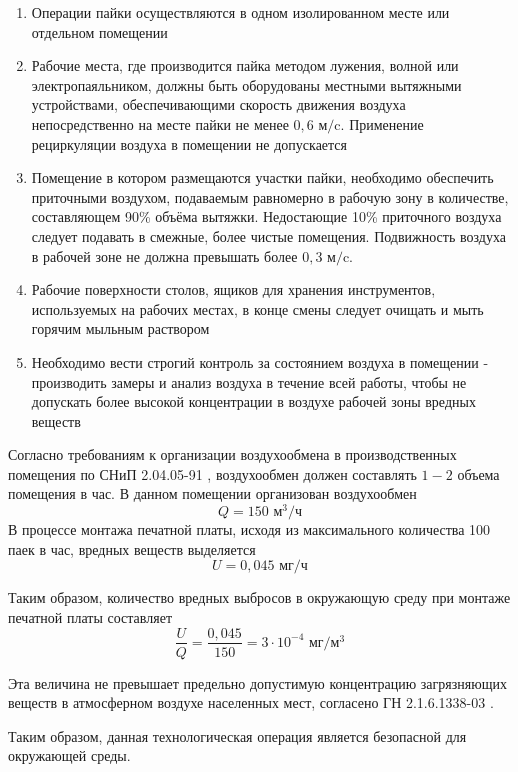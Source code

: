 \begin{enumerate}
    \item Операции пайки осуществляются в одном изолированном месте или отдельном помещении
    \item Рабочие места, где производится пайка методом лужения, волной или
        электропаяльником, должны быть оборудованы местными вытяжными устройствами,
        обеспечивающими скорость движения воздуха непосредственно на месте пайки
        не менее $0,6 \text{ м}/\text{c}$. Применение рециркуляции воздуха в
        помещении не допускается
    \item Помещение в котором размещаются участки пайки, необходимо обеспечить
        приточными воздухом, подаваемым равномерно в рабочую зону в количестве,
        составляющем 90\% объёма вытяжки. Недостающие 10\% приточного воздуха следует
        подавать в смежные, более чистые помещения. Подвижность воздуха в рабочей
        зоне не должна превышать более $0,3 \text{ м}/\text{c}$.
    \item Рабочие поверхности столов, ящиков для хранения инструментов, используемых
        на рабочих местах, в конце смены следует очищать и мыть горячим мыльным раствором
    \item Необходимо вести строгий контроль за состоянием воздуха в помещении -
        производить замеры и анализ воздуха в течение всей работы, чтобы не
        допускать более высокой концентрации в воздухе рабочей зоны вредных веществ
\end{enumerate}

Согласно требованиям к организации воздухообмена в производственных помещения
по СНиП 2.04.05-91 \cite{ecology_snip_04_05_95}, воздухообмен должен составлять
$1 - 2$ объема помещения в час. В данном помещении организован воздухообмен
$$
    Q = 150 \text{ м}^3/\text{ч}
$$
В процессе монтажа печатной платы, исходя из максимального количества 100 паек
в час, вредных веществ выделяется
$$
    U = 0,045 \text{ мг}/\text{ч}
$$

Таким образом, количество вредных выбросов в окружающую среду при монтаже
печатной платы составляет
$$
    \frac{U}{Q} = \frac{0,045}{150} = 3 \cdot 10^{-4} \text{ мг}/\text{м}^3
$$

Эта величина не превышает предельно допустимую концентрацию загрязняющих веществ
в атмосферном воздухе населенных мест, согласено ГН 2.1.6.1338-03 \cite{ecology_hygiene_norm_1338_03}.

Таким образом, данная технологическая операция является безопасной для окружающей среды.

